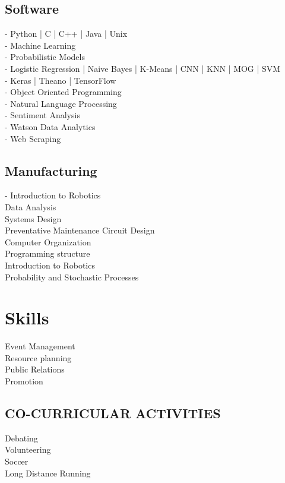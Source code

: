 \documentclass[]{deedy-resume-openfont}
\begin{document}
\begin{minipage}[t]{0.33\textwidth}
\subsection{Software}
- Python | C | C++ | Java | Unix\\
- Machine Learning \\
- Probabilistic Models \\
- Logistic Regression | Naive Bayes | K-Means | CNN | KNN | MOG | SVM \\
- Keras | Theano | TensorFlow \\
- Object Oriented Programming \\
- Natural Language Processing \\
- Sentiment Analysis \\
- Watson Data Analytics \\
- Web Scraping \\
\sectionsep

\subsection{Manufacturing}
-
Introduction to Robotics \\
Data Analysis \\
Systems Design \\
Preventative Maintenance
Circuit Design  \\
Computer Organization \\
Programming structure \\
Introduction to Robotics\\
Probability and Stochastic Processes\\
\sectionsep




\section{Skills}
Event Management\\
Resource planning\\
Public Relations\\
Promotion\\
\sectionsep


\subsection{CO-CURRICULAR ACTIVITIES}
Debating\\
Volunteering\\
Soccer\\
Long Distance Running\\
\sectionsep

%
%

\end{minipage} 
\end{document}
